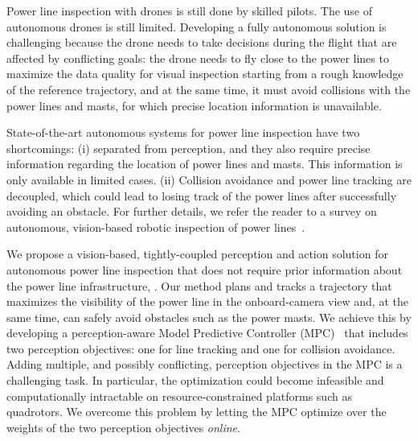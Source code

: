 Power line inspection with drones is still done by skilled pilots. The use of autonomous drones is still limited. Developing a fully autonomous solution is challenging because the drone needs to take decisions during the flight that are affected by conflicting goals: the drone needs to fly close to the power lines to maximize the data quality for visual inspection starting from a rough knowledge of the reference trajectory, and at the same time, it must avoid collisions with the power lines and masts, for which precise location information is unavailable.

State-of-the-art autonomous systems for power line inspection have two shortcomings:
(i)  separated from perception, and they also require precise information regarding the location of power lines and masts. This information is only available in limited cases. (ii) Collision avoidance and power line tracking are decoupled, which could lead to losing track of the power lines after successfully avoiding an obstacle. For further details, we refer the reader to a survey on autonomous, vision-based robotic inspection of power lines~\cite{jenssen2018automatic}.

We propose a vision-based, tightly-coupled perception and action solution for autonomous power line inspection that does not require prior information about the power line infrastructure, . Our method plans and tracks a trajectory that maximizes the visibility of the power line in the onboard-camera view and, at the same time, can safely avoid obstacles such as the power masts.
We achieve this by developing a perception-aware Model Predictive Controller (MPC)~\cite{Falanga18iros} that includes two perception objectives: one for line tracking and one for collision avoidance. Adding multiple, and possibly conflicting, perception objectives in the MPC is a challenging task. In particular, the optimization could become infeasible and computationally intractable on resource-constrained platforms such as quadrotors. We overcome this problem by letting the MPC optimize over the weights of the two perception objectives \emph{online}.

